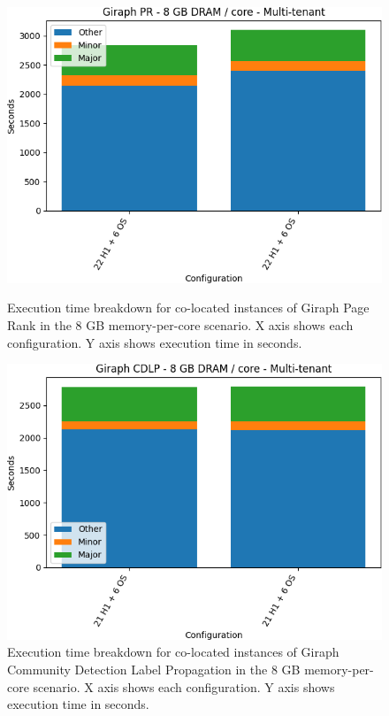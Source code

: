 \begin{figure}[thbp]
        \centering
    \includegraphics[width=\linewidth]{./fig/g_pr64.png}
    \caption{Execution time breakdown for co-located instances of Giraph
    Page Rank in the 8 GB memory-per-core scenario. X axis shows each configuration.
	Y axis shows execution time in seconds.}
    \label{fig:g_pr64}
    \includegraphics[width=\linewidth]{./fig/g_cdlp64.png}
    \caption{Execution time breakdown for co-located instances of Giraph
    Community Detection Label Propagation in the 8 GB memory-per-core scenario. X axis shows each configuration. 
	Y axis shows execution time in seconds.}
    \label{fig:g_cdlp64}
\end{figure}


